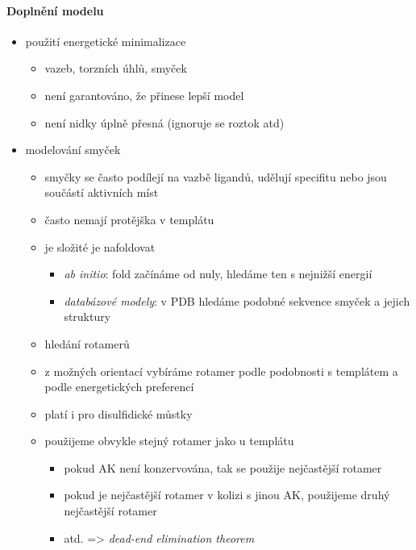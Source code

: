 \documentclass[DIV=8]{scrreprt}
\begin{document}
\paragraph{Doplnění modelu}
\begin{itemize}[nosep]
    \item použití energetické minimalizace
\begin{itemize}[nosep]
    \item vazeb, torzních úhlů, smyček
    \item není garantováno, že přinese lepší model
    \item není nidky úplně přesná (ignoruje se roztok atd)
\end{itemize}

    \item modelování smyček
\begin{itemize}[nosep]
    \item smyčky se často podílejí na vazbě ligandů, udělují specifitu nebo jsou součástí aktivních míst
    \item často nemají protějška v templátu
    \item je složité je nafoldovat
\begin{itemize}[nosep]
    \item \emph{ab initio}: fold začínáme od nuly, hledáme ten s nejnižší energií
    \item \emph{databázové modely}: v PDB hledáme podobné sekvence smyček a jejich struktury
\end{itemize}

    \item hledání rotamerů
    \item z možných orientací vybíráme rotamer podle podobnosti s templátem a podle energetických preferencí
    \item platí i pro disulfidické můstky
    \item použijeme obvykle stejný rotamer jako u templátu
\begin{itemize}[nosep]
    \item pokud AK není konzervována, tak se použije nejčastější rotamer
    \item pokud je nejčastější rotamer v kolizi s jinou AK, použijeme druhý nejčastější rotamer
    \item atd. => \emph{dead-end elimination theorem}
\end{itemize}

\end{itemize}

\end{itemize}
\end{document}
